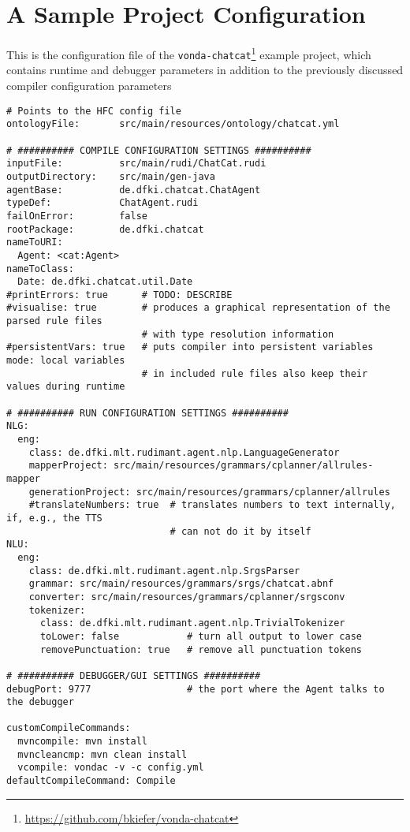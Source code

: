\section{A Sample Project Configuration} \label{sec:exampleconfig}

This is the configuration file of the
\texttt{vonda-chatcat}\footnote{\url{https://github.com/bkiefer/vonda-chatcat}}
example project, which contains runtime and debugger parameters in addition to
the previously discussed compiler configuration parameters

\begin{lstlisting}[style=yaml]
# Points to the HFC config file
ontologyFile:       src/main/resources/ontology/chatcat.yml

# ########## COMPILE CONFIGURATION SETTINGS ##########
inputFile:          src/main/rudi/ChatCat.rudi
outputDirectory:    src/main/gen-java
agentBase:          de.dfki.chatcat.ChatAgent
typeDef:            ChatAgent.rudi
failOnError:        false
rootPackage:        de.dfki.chatcat
nameToURI:
  Agent: <cat:Agent>
nameToClass:
  Date: de.dfki.chatcat.util.Date
#printErrors: true      # TODO: DESCRIBE
#visualise: true        # produces a graphical representation of the parsed rule files
                        # with type resolution information
#persistentVars: true   # puts compiler into persistent variables mode: local variables
                        # in included rule files also keep their values during runtime

# ########## RUN CONFIGURATION SETTINGS ##########
NLG:
  eng:
    class: de.dfki.mlt.rudimant.agent.nlp.LanguageGenerator
    mapperProject: src/main/resources/grammars/cplanner/allrules-mapper
    generationProject: src/main/resources/grammars/cplanner/allrules
    #translateNumbers: true  # translates numbers to text internally, if, e.g., the TTS
                             # can not do it by itself
NLU:
  eng:
    class: de.dfki.mlt.rudimant.agent.nlp.SrgsParser
    grammar: src/main/resources/grammars/srgs/chatcat.abnf
    converter: src/main/resources/grammars/cplanner/srgsconv
    tokenizer:
      class: de.dfki.mlt.rudimant.agent.nlp.TrivialTokenizer
      toLower: false            # turn all output to lower case
      removePunctuation: true   # remove all punctuation tokens

# ########## DEBUGGER/GUI SETTINGS ##########
debugPort: 9777                 # the port where the Agent talks to the debugger

customCompileCommands:
  mvncompile: mvn install
  mvncleancmp: mvn clean install
  vcompile: vondac -v -c config.yml
defaultCompileCommand: Compile
\end{lstlisting}

